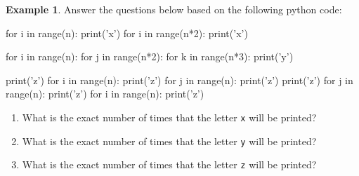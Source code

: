 \documentclass[10pt]{article}
\theoremstyle{definition}
\newtheorem{example}{Example}
\begin{document}
\newpage
\begin{example}
Answer the questions below based on the following python code:
\begin{python}
for i in range(n):
    print('x')
for i in range(n*2):
    print('x')

for i in range(n):
    for j in range(n*2):
        for k in range(n*3):
            print('y')

print('z')
for i in range(n):
    print('z')
    for j in range(n):
        print('z')
        print('z')
    for j in range(n):
        print('z')
for i in range(n):
    print('z')
\end{python}
    \begin{enumerate}
        \item What is the exact number of times that the letter \texttt{x} will be printed?
            \vspace{1.5in}
        \item What is the exact number of times that the letter \texttt{y} will be printed?
            \vspace{1.5in}
        \item What is the exact number of times that the letter \texttt{z} will be printed?
    \end{enumerate}
\end{example}
\end{document}
